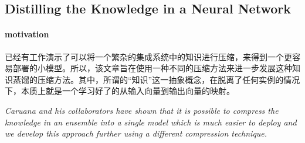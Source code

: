 \documentclass[11pt]{article} %
\begin{document}
\begin{CJK}{UTF8}{gkai}
\subsection{Distilling the Knowledge in a Neural Network}
\paragraph{motivation}
已经有工作演示了可以将一个繁杂的集成系统中的知识进行压缩，来得到一个更容易部署的小模型。所以，该文章旨在使用一种不同的压缩方法来进一步发展这种知识蒸馏的压缩方法。其中，所谓的“知识”这一抽象概念，在脱离了任何实例的情况下，本质上就是一个学习好了的从输入向量到输出向量的映射。
\par \emph{Caruana and his collaborators have shown that it is possible to
compress the knowledge in an ensemble into a single model which is much easier to deploy and we develop this approach further using a different compression technique.  }


\end{CJK}
\end{document}

